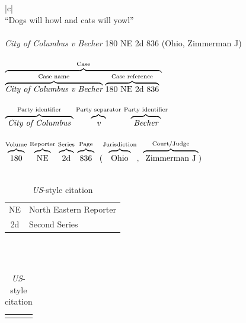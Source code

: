 \begin{table}
\begin{center}
\begin{tabular}{|c|}
\hline \\
``Dogs will howl and cats will yowl''
\\ \\%
\textit{City of Columbus v Becher} 180 NE 2d 836 (Ohio, Zimmerman J)%
\\ \\%
$%
\stackrel{\textrm{Case}}{%
\overbrace{%
\stackrel{\textrm{Case name}}{\overbrace{\textit{City of Columbus v Becher}}}\ 
\stackrel{\textrm{Case reference}}{\overbrace{\textrm{180 NE 2d 836}}}\ 
}}
$%
\\ \\%
$%
\stackrel{\textrm{Party identifier}}{\overbrace{\textit{\phantom{[}City of Columbus\phantom{[}}}}\ 
\stackrel{\textrm{Party separator}}{\overbrace{\textit{\phantom{[}v\phantom{[}}}}\ 
\stackrel{\textrm{Party identifier}}{\overbrace{\textit{\phantom{[}Becher\phantom{[}}}}\ 
$%
\\ \\%
$%
\stackrel{\textrm{Volume}}{\overbrace{\textrm{\strut\phantom{[}180\phantom{[}}}}\ 
\stackrel{\textrm{Reporter}}{\overbrace{\textrm{\strut\phantom{[}NE\phantom{[}}}}\ 
\stackrel{\textrm{Series}}{\overbrace{\textrm{\strut\phantom{[}2d\phantom{[}}}}\ 
\stackrel{\textrm{Page}}{\overbrace{\textrm{\strut\phantom{[}836\phantom{[}}}}\ (
\stackrel{\textrm{Jurisdiction}}{\overbrace{\textrm{\strut\phantom{[}Ohio\phantom{[}}}},\ 
\stackrel{\textrm{Court/Judge}}{\overbrace{\textrm{\strut\phantom{[}Zimmerman J\phantom{[}}}})\ 
$%
\\ \\%
\begin{tabular}{cl}
NE & North Eastern Reporter \\
2d & Second Series \\
\end{tabular}
\\ \mg \\%
\hline
\end{tabular}
\begin{tabular}{l}
 \lcinline{columbusne}\\
\end{tabular}
\caption{\textit{US}-style citation}
\label{tab:usstyle}
\end{center}
\end{table}

